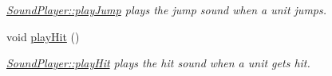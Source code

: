 \begin{DoxyCompactItemize}
\begin{DoxyCompactList}\small\item\em \hyperlink{class_sound_player_a854749ef29c5620f8b3b6355b7015d01}{Sound\+Player\+::play\+Jump} plays the jump sound when a unit jumps. \end{DoxyCompactList}\item 
void \hyperlink{class_sound_player_a620011ab815ca67880615766518e3157}{play\+Hit} ()\hypertarget{class_sound_player_a620011ab815ca67880615766518e3157}{}\label{class_sound_player_a620011ab815ca67880615766518e3157}

\begin{DoxyCompactList}\small\item\em \hyperlink{class_sound_player_a620011ab815ca67880615766518e3157}{Sound\+Player\+::play\+Hit} plays the hit sound when a unit gets hit. \end{DoxyCompactList}\end{DoxyCompactItemize}
